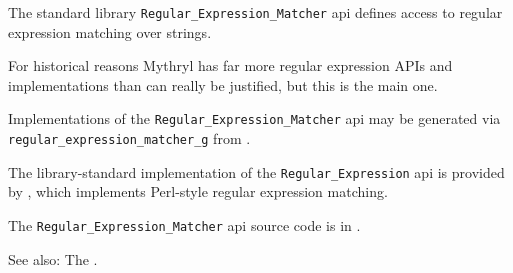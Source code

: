 
The standard library {\tt Regular\_Expression\_Matcher} api defines access to regular expression matching 
over strings.

For historical reasons Mythryl has far more regular expression APIs and implementations than 
can really be justified, but this is the main one.

Implementations of the {\tt Regular\_Expression\_Matcher} api may be generated via 
{\tt regular\_expression\_matcher\_g} from .

The library-standard implementation of the {\tt Regular\_Expression} api is 
provided by , which implements Perl-style regular expression matching.

The {\tt Regular\_Expression\_Matcher} api source code is in .

See also:  The .

